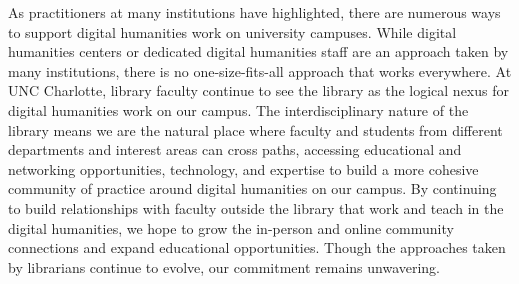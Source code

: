 \documentclass[final]{anthology-ch}
\begin{document}
As practitioners at many institutions have highlighted, there are numerous ways to support digital humanities work on university campuses. While digital humanities centers or dedicated digital humanities staff are an approach taken by many institutions, there is no one-size-fits-all approach that works everywhere. At UNC Charlotte, library faculty continue to see the library as the logical nexus for digital humanities work on our campus. The interdisciplinary nature of the library means we are the natural place where faculty and students from different departments and interest areas can cross paths, accessing educational and networking opportunities, technology, and expertise to build a more cohesive community of practice around digital humanities on our campus. By continuing to build relationships with faculty outside the library that work and teach in the digital humanities, we hope to grow the in-person and online community connections and expand educational opportunities. Though the approaches taken by librarians continue to evolve, our commitment remains unwavering.

\printbibliography
\end{document}
